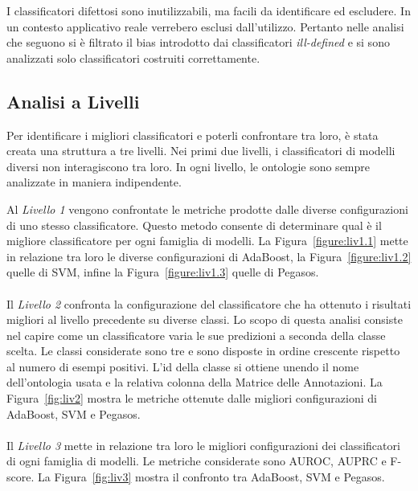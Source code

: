 \documentclass[12pt,a4paper,oneside,hidelinks]{report}
\begin{document}
I classificatori difettosi sono inutilizzabili, ma facili da identificare ed escludere. In un contesto applicativo reale verrebero esclusi dall'utilizzo. Pertanto nelle analisi che seguono si è filtrato il bias introdotto dai classificatori \emph{ill-defined} e si sono analizzati solo classificatori costruiti correttamente.

\subsection{Analisi a Livelli}
Per identificare i migliori classificatori e poterli confrontare tra loro, è stata creata una struttura a tre livelli. Nei primi due livelli, i classificatori di modelli diversi non interagiscono tra loro. In ogni livello, le ontologie sono sempre analizzate in maniera indipendente. 

Al \textit{Livello 1} vengono confrontate le metriche prodotte dalle diverse configurazioni di uno stesso classificatore. Questo metodo consente di determinare qual è il migliore classificatore per ogni famiglia di modelli. La Figura~\ref{figure:liv1.1} mette in relazione tra loro le diverse configurazioni di AdaBoost, la Figura~\ref{figure:liv1.2} quelle di SVM, infine la Figura~\ref{figure:liv1.3} quelle di Pegasos.

\paragraph*{}
Il \textit{Livello 2} confronta la configurazione del classificatore che ha ottenuto i risultati migliori al livello precedente su diverse classi. Lo scopo di questa analisi consiste nel capire come un classificatore varia le sue predizioni a seconda della classe scelta. Le classi considerate sono tre e sono disposte in ordine crescente rispetto al numero di esempi positivi. L'id della classe si ottiene unendo il nome dell'ontologia usata e la relativa colonna della Matrice delle Annotazioni.
La Figura~\ref{fig:liv2} mostra le metriche ottenute dalle migliori configurazioni di AdaBoost, SVM e Pegasos.

\paragraph*{}
Il \textit{Livello 3} mette in relazione tra loro le migliori configurazioni dei classificatori di ogni famiglia di modelli. Le metriche considerate sono AUROC, AUPRC e F-score. La Figura~\ref{fig:liv3} mostra il confronto tra AdaBoost, SVM e Pegasos.
\end{document}
